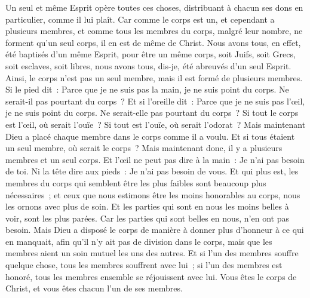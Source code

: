 \begin{multicols}{2}
Un seul et même Esprit opère toutes ces choses, distribuant à chacun ses dons en particulier, comme il lui plaît.
Car comme le corps est un, et cependant a plusieurs membres, et comme tous les membres du corps, malgré leur nombre, ne forment qu'un seul corps, il en est de même de Christ.
Nous avons tous, en effet, été baptisés d'un même Esprit, pour être un même corps, soit Juifs, soit Grecs, soit esclaves, soit libres, nous avons tous, dis-je, été abreuvés d'un seul Esprit.
Ainsi, le corps n'est pas un seul membre, mais il est formé de plusieurs membres.
Si le pied dit~: Parce que je ne suis pas la main, je ne suis point du corps. Ne serait-il pas pourtant du corps~?
Et si l'oreille dit~: Parce que je ne suis pas l'œil, je ne suis point du corps. Ne serait-elle pas pourtant du corps~?
Si tout le corps est l'œil, où serait l'ouïe~? Si tout est l'ouïe, où serait l'odorat~?
Mais maintenant Dieu a placé chaque membre dans le corps comme il a voulu.
Et si tous étaient un seul membre, où serait le corps~?
Mais maintenant donc, il y a plusieurs membres et un seul corps.
Et l'œil ne peut pas dire à la main~: Je n'ai pas besoin de toi. Ni la tête dire aux pieds~: Je n'ai pas besoin de vous.
Et qui plus est, les membres du corps qui semblent être les plus faibles sont beaucoup plus nécessaires~;
et ceux que nous estimons être les moins honorables au corps, nous les ornons avec plus de soin. Et les parties qui sont en nous les moins belles à voir, sont les plus parées. 
Car les parties qui sont belles en nous, n'en ont pas besoin. Mais Dieu a disposé le corps de manière à donner plus d'honneur à ce qui en manquait,
afin qu'il n'y ait pas de division dans le corps, mais que les membres aient un soin mutuel les uns des autres.
Et si l'un des membres souffre quelque chose, tous les membres souffrent avec lui~; si l'un des membres est honoré, tous les membres ensemble se réjouissent avec lui.
Vous êtes le corps de Christ, et vous êtes chacun l'un de ses membres.

\end{multicols}
